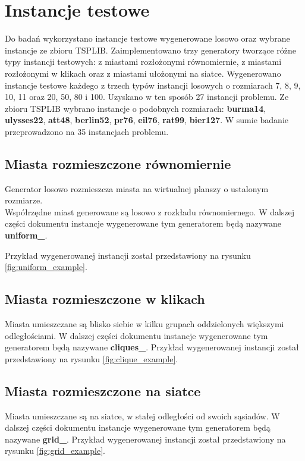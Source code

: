 \section{Instancje testowe}
Do badań wykorzystano instancje testowe wygenerowane losowo oraz wybrane instancje ze zbioru TSPLIB.
Zaimplementowano trzy generatory tworzące różne typy instancji testowych: z miastami rozłożonymi równomiernie,
z miastami rozłożonymi w klikach oraz z miastami ułożonymi na siatce.
Wygenerowano instancje testowe każdego z trzech typów instancji losowych o rozmiarach 7, 8, 9, 10, 11 oraz 20, 50, 80 i 100.
Uzyskano w ten sposób 27 instancji problemu.
Ze zbioru TSPLIB wybrano instancje o podobnych rozmiarach: \textbf{burma14}, \textbf{ulysses22}, \textbf{att48}, \textbf{berlin52}, \textbf{pr76}, \textbf{eil76}, \textbf{rat99},
\textbf{bier127}.
W sumie badanie przeprowadzono na 35 instancjach problemu.

\subsection*{Miasta rozmieszczone równomiernie}
Generator losowo rozmieszcza miasta na wirtualnej planszy o ustalonym rozmiarze.\\
Współrzędne miast generowane są losowo z rozkładu równomiernego.
W dalszej części dokumentu instancje wygenerowane tym generatorem będą nazywane \textbf{uniform\_<liczba miast>}.

Przykład wygenerowanej instancji został przedstawiony na rysunku \ref{fig:uniform_example}.

\subsection*{Miasta rozmieszczone w klikach}
Miasta umieszczane są blisko siebie w kilku grupach oddzielonych większymi odległościami.
W dalszej części dokumentu instancje wygenerowane tym generatorem będą nazywane \textbf{cliques\_<liczba miast>}.
Przykład wygenerowanej instancji został przedstawiony na rysunku \ref{fig:clique_example}.


\subsection*{Miasta rozmieszczone na siatce}
Miasta umieszczane są na siatce, w stałej odległości od swoich sąsiadów.
W dalszej części dokumentu instancje wygenerowane tym generatorem będą nazywane \textbf{grid\_<liczba miast>}.
Przykład wygenerowanej instancji został przedstawiony na rysunku \ref{fig:grid_example}.

